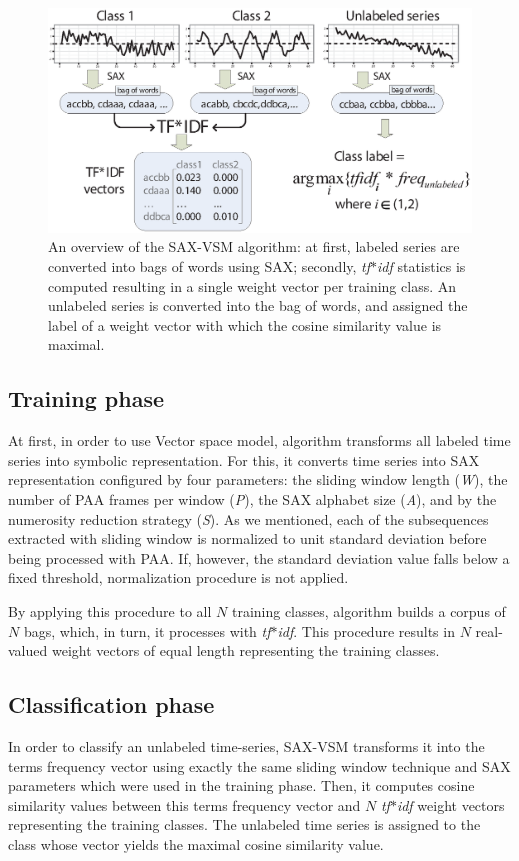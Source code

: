 \documentclass{llncs}
\newcommand{\myfigureshrinker}{\vspace{-1.1cm}}
\begin{document}
\begin{figure}[t]
   \centering
   \myfigureshrinker
   \includegraphics[width=115mm]{figures/overview.eps}
   \caption{
   An overview of the SAX-VSM algorithm: 
   at first, labeled series are converted into bags of words using SAX; 
   secondly, \textit{tf$\ast$idf} statistics is computed resulting in 
   a single weight vector per training class. An unlabeled series is converted 
   into the bag of words, and assigned the label of a weight vector with which 
   the cosine similarity value is maximal.}
   \label{fig:overview}
\end{figure}

\subsection{Training phase}
At first, in order to use Vector space model, algorithm transforms all labeled 
time series into symbolic representation. For this, it converts time series into SAX
representation configured by four parameters: the sliding window length (\textit{W}),
the number of PAA frames per window (\textit{P}), the SAX alphabet size
(\textit{A}), and by the numerosity reduction strategy (\textit{S}). 
As we mentioned, each of the subsequences extracted with sliding window is 
normalized to unit standard deviation before being processed with PAA.
If, however, the standard deviation value falls below a fixed threshold, normalization 
procedure is not applied.

By applying this procedure to all $N$ training classes, algorithm builds a corpus 
of $N$ bags, which, in turn, it processes with \textit{tf$\ast$idf}. 
This procedure results in $N$ real-valued weight vectors of equal length 
representing the training classes. 

\subsection{Classification phase}
In order to classify an unlabeled time-series, SAX-VSM transforms it into the 
terms frequency vector using exactly the same sliding window technique and SAX 
parameters which were used in the training phase. 
Then, it computes cosine similarity values between this terms frequency vector and 
$N$ \textit{tf$\ast$idf} weight vectors representing the training classes. 
The unlabeled time series is assigned to the class whose vector yields the maximal 
cosine similarity value.
\end{document}
